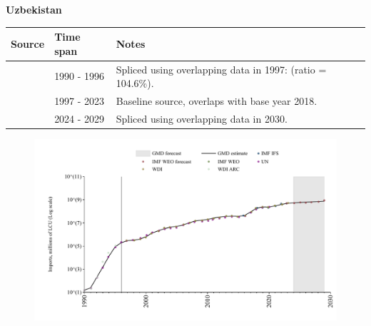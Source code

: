 \documentclass[12pt,a4paper,landscape]{article}
\begin{document}
\begin{adjustbox}{max totalsize={\paperwidth}{\paperheight},center}
\begin{minipage}[t][\textheight][t]{\textwidth}
\vspace*{0.5cm}
{}
\begin{center}
{\Large\bfseries Uzbekistan}
\end{center}
\vspace{0.5cm}
\begin{table}[H]
\centering
\small
\begin{tabular}{|l|l|l|}
\hline
\textbf{Source} & \textbf{Time span} & \textbf{Notes} \\
\hline
\rowcolor{white}\cite{UN}& 1990 - 1996 &Spliced using overlapping data in 1997: (ratio = 104.6\%).\\
\rowcolor{lightgray}\cite{WDI}& 1997 - 2023 &Baseline source, overlaps with base year 2018.\\
\rowcolor{white}\cite{IMF_WEO_forecast}& 2024 - 2029 &Spliced using overlapping data in 2030.\\
\hline
\end{tabular}
\end{table}
\begin{figure}[H]
\centering
\includegraphics[width=\textwidth,height=0.6\textheight,keepaspectratio]{graphs/UZB_imports.pdf}
\end{figure}
\end{minipage}
\end{adjustbox}
\end{document}
